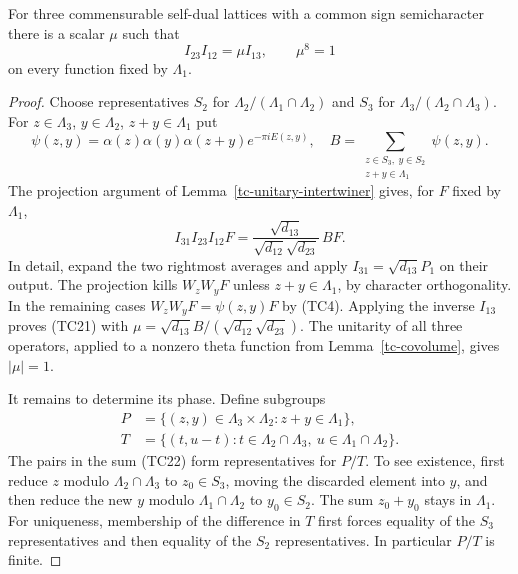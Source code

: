\begin{theorem}\label{tc-triple}
For three commensurable self-dual lattices with a common sign
semicharacter there is a scalar $\mu$ such that
\[
                      I_{23}I_{12}=\mu I_{13},
                         \qquad \mu^8=1
 \tag{TC21}
\]
on every function fixed by $\Lambda_1$.
\end{theorem}
\begin{proof}
Choose representatives $S_2$ for
$\Lambda_2/(\Lambda_1\cap\Lambda_2)$ and $S_3$ for
$\Lambda_3/(\Lambda_2\cap\Lambda_3)$.
For $z\in\Lambda_3$, $y\in\Lambda_2$, $z+y\in\Lambda_1$
put
\[
 \psi(z,y)=\alpha(z)\alpha(y)\alpha(z+y)e^{-\pi iE(z,y)},
 \quad
 B=\sum_{\substack{z\in S_3,\ y\in S_2\\z+y\in\Lambda_1}}
                         \psi(z,y).
 \tag{TC22}
\]
The projection argument of Lemma~\ref{tc-unitary-intertwiner}
gives, for $F$ fixed by $\Lambda_1$,
\[
 I_{31}I_{23}I_{12}F
       =\frac{\sqrt{d_{13}}}{\sqrt{d_{12}}\sqrt{d_{23}}}\,BF.
 \tag{TC23}
\]
In detail, expand the two rightmost averages and apply
$I_{31}=\sqrt{d_{13}}P_1$ on their output.
The projection kills $W_zW_yF$ unless $z+y\in\Lambda_1$,
by character orthogonality.  In the remaining cases
$W_zW_yF=\psi(z,y)F$ by (TC4).
Applying the inverse $I_{13}$ proves (TC21) with
$\mu=\sqrt{d_{13}}B/(\sqrt{d_{12}}\sqrt{d_{23}})$.
The unitarity of all three operators, applied to a nonzero
theta function from Lemma~\ref{tc-covolume}, gives $|\mu|=1$.

It remains to determine its phase.  Define subgroups
\[
 \begin{split}
 P&=\{(z,y)\in\Lambda_3\times\Lambda_2:z+y\in\Lambda_1\},\\
 T&=\{(t,u-t):t\in\Lambda_2\cap\Lambda_3,\
                         u\in\Lambda_1\cap\Lambda_2\}.
 \end{split}
 \tag{TC24}
\]
The pairs in the sum (TC22) form representatives for $P/T$.
To see existence, first reduce $z$ modulo
$\Lambda_2\cap\Lambda_3$ to $z_0\in S_3$, moving the
discarded element into $y$, and then reduce the new $y$
modulo $\Lambda_1\cap\Lambda_2$ to $y_0\in S_2$.
The sum $z_0+y_0$ stays in $\Lambda_1$.
For uniqueness, membership of the difference in $T$ first
forces equality of the $S_3$ representatives and then
equality of the $S_2$ representatives.  In particular $P/T$
is finite.


\end{proof}
